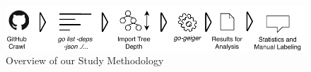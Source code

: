 \begin{figure}[ht]
    \includegraphics[width=\textwidth]{assets/figures/study-methodology.pdf}
    \caption{Overview of our Study Methodology}
    \label{fig:study-methodology}
\end{figure}
